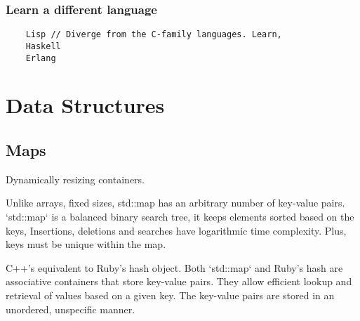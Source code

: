 \documentclass[openany]{report}
\begin{document}
\subsection{Learn a different language}

\begin{verbatim}
    Lisp // Diverge from the C-family languages. Learn,
    Haskell
    Erlang
\end{verbatim}



\chapter{Data Structures}

\section{Maps}

Dynamically resizing containers.

Unlike arrays, fixed sizes, std::map has an arbitrary number of key-value pairs.
`std::map` is a balanced binary search tree, it keeps elements sorted based on the keys, 
Insertions, deletions and searches have logarithmic time complexity.
Plus, keys must be unique within the map.

C++'s equivalent to Ruby's hash object. 
Both `std::map` and Ruby's hash are associative containers that store key-value pairs.
They allow efficient lookup and retrieval of values based on a given key.
The key-value pairs are stored in an unordered, unspecific manner.
\end{document}
